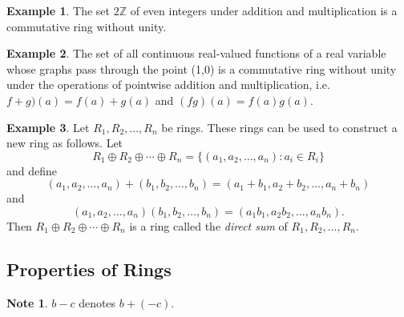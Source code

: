 \documentclass{article}
\newtheorem{theorem}{Theorem}[section]
\theoremstyle{definition}
\newtheorem{example}{Example}[section]
\newtheorem{note}{Note}[section]
\begin{document}
    \begin{example}
        The set $2\mathbb{Z}$ of even integers under addition and multiplication is a commutative ring without unity.
    \end{example}
    
    \begin{example}
        The set of all continuous real-valued functions of a real variable whose graphs pass through the point (1,0) is a commutative ring without unity under the operations of pointwise addition and multiplication, i.e. $f+g)(a)=f(a)+g(a)$ and $(fg)(a)=f(a)g(a)$.
    \end{example}
    
    \begin{example}
        Let $R_1,R_2,\dots,R_n$ be rings. These rings can be used to construct a new ring as follows. Let
        \begin{equation*}
            R_1\oplus R_2 \oplus\cdots\oplus R_n =\{(a_1,a_2,\dots,a_n):a_i\in R_i\}
        \end{equation*}
        and define
        \begin{equation*}
            (a_1,a_2,\dots,a_n)+(b_1,b_2,\dots,b_n)=(a_1+b_1,a_2+b_2,\dots,a_n+b_n)
        \end{equation*}
        and
        \begin{equation*}
            (a_1,a_2,\dots,a_n)(b_1,b_2,\dots,b_n)=(a_1b_1,a_2b_2,\dots,a_nb_n).
        \end{equation*}
        Then $ R_1\oplus R_2 \oplus\cdots\oplus R_n$ is a ring called the \textit{direct sum} of $R_1,R_2,\dots,R_n$.
    \end{example}
    
    
    \subsection{Properties of Rings}
    \begin{note}
        $b-c$ denotes $b+(-c)$.
    \end{note}
    
    \noindent{}
    
\end{document}
